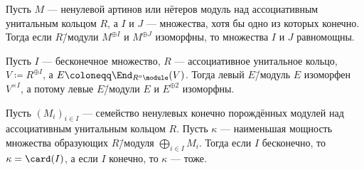 \documentclass[
	extrafontsizes,
	11pt,
	hyphens,
]{memoir}
\begin{document}
\begin{corollary}
Пусть \(M\) --- ненулевой артинов или нётеров модуль над ассоциативным унитальным кольцом \(R\), а \(I\) и \(J\) --- множества, хотя бы одно из которых конечно.%
Тогда если \(R\)\=/модули \(M^{\oplus I}\) и \(M^{\oplus J}\) изоморфны, то множества \(I\) и \(J\) равномощны.
\end{corollary}

%

\begin{example}
Пусть \(I\) --- бесконечное множество, \(R\) --- ассоциативное унитальное кольцо, \(V \coloneqq R^{\oplus I}\), а \(E \coloneqq \End_{R^o\module}(V)\). Тогда левый \(E\)\=/модуль \(E\) изоморфен \(V^{\times I}\), а потому левые \(E\)\=/модули \(E\) и \(E^{\oplus 2}\) изоморфны.
\end{example}


\begin{observation}
Пусть \((M_i)_{i \in I}\) --- семейство ненулевых конечно порождённых модулей над ассоциативным унитальным кольцом \(R\).%
\label{obs:FinGenModInfDirPow}
Пусть \(\kappa\) --- наименьшая мощность множества образующих \(R\)\=/модуля \(\bigoplus_{i \in I} M_i\).
Тогда если \(I\) бесконечно, то \(\kappa = \card(I)\), а если \(I\) конечно, то \(\kappa\) --- тоже.
\end{observation}
\end{document}
